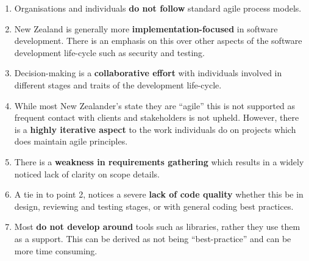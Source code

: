 \begin{enumerate}
\item Organisations and individuals \textbf{do not follow} standard agile process models.
\item New Zealand is generally more \textbf{implementation-focused} in software development. There is an emphasis on this over other aspects of the software development life-cycle such as security and testing. 
\item Decision-making is a \textbf{collaborative effort} with individuals involved in different stages and traits of the development life-cycle. 
\item While most New Zealander's state they are “agile” this is not supported as frequent contact with clients and stakeholders is not upheld. However, there is a \textbf{highly iterative aspect} to the work individuals do on projects which does maintain agile principles. 
\item There is a \textbf{weakness in requirements gathering} which results in a widely noticed lack of clarity on scope details. 
\item A tie in to point 2, notices a severe \textbf{lack of code quality} whether this be in design, reviewing and testing stages, or with general coding best practices. 
\item Most \textbf{do not develop around }tools such as libraries, rather they use them as a support. This can be derived as not being “best-practice” and can be more time consuming. 
\end{enumerate}

